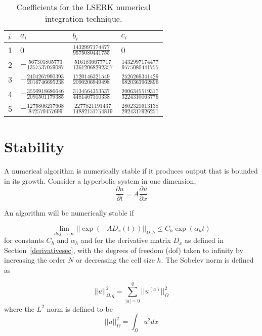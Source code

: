 \documentclass{article}
\begin{document}
\begin{table}
\begin{tabular}{llll}
\hline
$i$ &$a_i$ &$b_i$ &$c_i$\\
\hline
1 &0 &$\frac{1432997174477}{9575080441755}$ &0\\
2 &$-\frac{567301805773}{1357537059087}$ &$\frac{5161836677717}{13612068292357}$
&$\frac{1432997174477}{9575080441755}$\\
3 &$-\frac{2404267990393}{2016746695238}$ &$\frac{1720146321549}{2090206949498}$
&$\frac{2526269341429}{6820363962896}$\\
4 &$-\frac{3550918686646}{2091501179385}$ &$\frac{3134564353537}{4481467310338}$
&$\frac{2006345519317}{3224310063776}$\\
5 &$-\frac{1275806237668}{842570457699}$ &$\frac{2277821191437}{14882151754819}$
&$\frac{2802321613138}{2924317926251}$\\
\hline
\end{tabular}
\label{rkcoeff}
\caption{Coefficients for the LSERK numerical integration technique.}
\end{table}


\section{Stability}

A numerical algorithm is numerically stable if it produces output that
is bounded in its growth. Consider a hyperbolic system in one dimension,
\begin{equation}
\frac{\partial u}{\partial t}=A\frac{\partial u}{\partial x}
\end{equation}

An algorithm will be numerically stable if 

\begin{equation}
\displaystyle\lim_{dof\rightarrow\infty}||\exp(-AD_x(t))||_{\Omega,h}\le
C_h\exp(\alpha_h t)
\end{equation}
for constants $C_h$ and $\alpha_h$ and for the derivative matrix $D_x$
as defined in Section~\ref{derivativesec}, with the degrees of freedom
(dof) taken to infinity by increasing the order $N$ or decreasing the
cell size $h$. The Sobelev norm is defined as 

\begin{equation}
||u||^2_{\Omega,q}=\displaystyle\sum_{|a|=0}^q||u^(a)||^2_{\Omega}
\end{equation}
where the $L^2$ norm is defined to be
\begin{equation}
||u||^2_{\Omega}=\displaystyle\int_{\Omega}u^2 dx
\end{equation}
\end{document}
